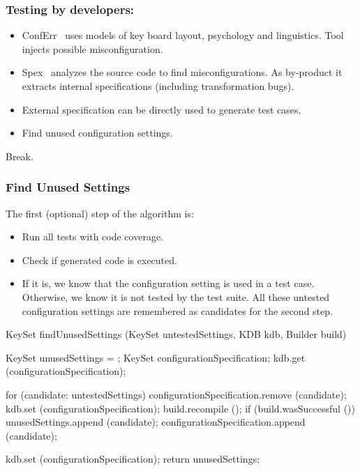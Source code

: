 \begin{frame}
	\frametitle{Testing by developers:}
	\begin{itemize}[<+-| alert@+>]
	\item ConfErr~\cite{keller2008conferr} uses models of key board layout, psychology and linguistics.
	Tool injects possible misconfiguration.
	\item Spex~\cite{xu2013blame} analyzes the source code to find misconfigurations.
	As by-product it extracts internal specifications (including transformation bugs).
	\item External specification can be directly used to generate test cases.
	\item Find unused configuration settings.
	\end{itemize}
\end{frame}

\begin{assignment}
	\begin{task}
	Break.
	\end{task}
\end{assignment}


\begin{frame}
	\frametitle{Find Unused Settings}

	The first (optional) step of the algorithm is:
	\begin{itemize}
	\item Run all tests with code coverage.
	\item Check if generated code is executed.
	\item If it is, we know that the configuration setting is used in a test case.
	Otherwise, we know it is not tested by the test suite.
	All these untested configuration settings are remembered as candidates for the second step.
	\end{itemize}
\end{frame}

\begin{frame}[fragile]
	\small
	\fontsize{10}{0}\selectfont
	\begin{code}[gobble=4,language=Cpp]
	KeySet findUnusedSettings (KeySet untestedSettings,
				   KDB kdb,
				   Builder build)
	{
	   KeySet unusedSettings = {};
	   KeySet configurationSpecification;
	   kdb.get (configurationSpecification);

	   for (candidate: untestedSettings)
	   {
	       configurationSpecification.remove (candidate);
	       kdb.set (configurationSpecification);
	       build.recompile ();
	       if (build.wasSuccessful ())
	       {
	          unusedSettings.append (candidate);
	       }
	       configurationSpecification.append (candidate);
	   }

	   kdb.set (configurationSpecification);
	   return unusedSettings;
	}
	\end{code}
\end{frame}


